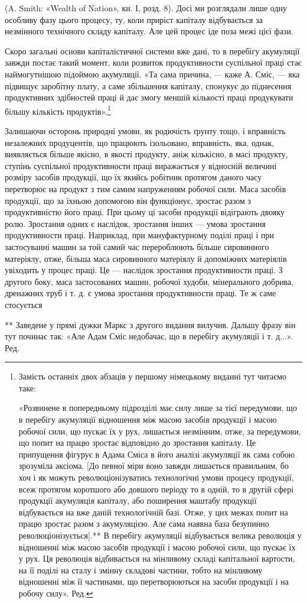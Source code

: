 (A. Smith: «Wealth of Nation», кн. І, розд. 8). Досі ми розглядали
лише одну особливу фазу цього процесу, ту, коли приріст капіталу
відбувається за незмінного технічного складу капіталу.
Але цей процес іде поза межі цієї фази.

Скоро загальні основи капіталістичної системи вже дані, то
в перебігу акумуляції завжди постає такий момент, коли розвиток
продуктивности суспільної праці стає наймогутнішою
підоймою акумуляції. «Та сама причина, — каже А. Сміс, —
яка підвищує заробітну плату, а саме збільшення капіталу,
спонукує до піднесення продуктивних здібностей праці й дає
змогу меншій кількості праці продукувати більшу кількість
продуктів».\footnote*{
Замість останніх двох абзаців у першому німецькому виданні
тут читаємо таке:

«Розвинене в попередньому підрозділі має силу лише за тієї передумови,
що в перебігу акумуляції відношення між масою засобів продукції і
масою робочої сили, що пускає їх у рух, лишається незмінним, отже,
за передумови, що попит на працю зростає відповідно до зростання капіталу.
Це припущення фігурує в Адама Сміса в його аналізі акумуляції
як сама собою зрозуміла аксіома. [До певної міри воно завжди лишається
правильним, бо хоч і як можуть революціонізуватись технологічні умови
процесу продукції, всеж протягом коротшого або довшого періоду то в одній,
то в другій сфері продукції акумуляція капіталу, або поширення маштабу
продукції відбувається на вже даній технологічній базі. Отже, у цих межах
попит на працю зростає разом з акумуляцією. Але сама наявна база
безупинно революціонізується].** В перебігу акумуляції відбувається
велика революція у відношенні між масою засобів продукції і масою робочої
сили, що пускає їх у рух. Ця революція відбивається на мінливому
складі капітальної вартости, на її поділі на сталу і змінну складові частини,
тобто на мінливому відношенні між її частинами, що перетворюються
на засоби продукції і на робочу силу». Ред.
}

Залишаючи осторонь природні умови, як родючість ґрунту
тощо, і вправність незалежних продуцентів, що працюють ізольовано,
вправність, яка, однак, виявляється більше якісно, в якості
продукту, аніж кількісно, в масі продукту, ступінь суспільної
продуктивности праці виражається у відносній величині розміру
засобів продукції, що їх якийсь робітник протягом даного часу
перетворює на продукт з тим самим напруженням робочої сили.
Маса засобів продукції, що за їхньою допомогою він функціонує,
зростає разом з продуктивністю його праці. При цьому ці засоби
продукції відіграють двояку ролю. Зростання одних є наслідок,
зростання інших — умова зростання продуктивности праці.
Наприклад, при мануфактурному поділі праці і при застосуванні
машин за той самий час перероблюють більше сировинного матеріялу,
отже, більша маса сировинного матеріялу й допоміжних
матеріялів увіходить у процес праці. Це — наслідок зростання
продуктивности праці. З другого боку, маса застосованих машин,
робочої худоби, мінерального добрива, дренажних труб і т. д.
є умова зростання продуктивности праці. Те ж саме стосується

** Заведене у прямі дужки Маркс з другого видання вилучив. Дальшу
фразу він тут починає так: «Але Адам Сміс недобачає, що в перебігу
акумуляції і т. д...». Ред.
